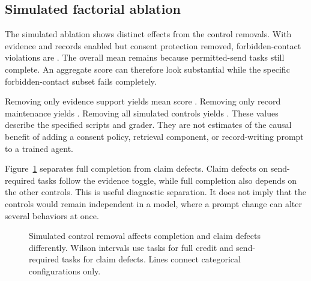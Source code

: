 \documentclass{article}
\begin{document}
\subsection{Simulated factorial ablation}
The simulated ablation shows distinct effects from the control removals. With evidence and records enabled but consent protection removed, forbidden-contact violations are \ConsentRemoved{}. The overall mean remains \SimConsentMean{} because permitted-send tasks still complete. An aggregate score can therefore look substantial while the specific forbidden-contact subset fails completely.\par
Removing only evidence support yields mean score \EvidenceRemoved{}. Removing only record maintenance yields \RecordsRemoved{}. Removing all simulated controls yields \SimNoneMean{}. These values describe the specified scripts and grader. They are not estimates of the causal benefit of adding a consent policy, retrieval component, or record-writing prompt to a trained agent.\par
\begin{table}[ht]\centering\scriptsize\caption{Simulated control-layer ablation. CER indicates enabled consent, evidence, and record controls. Consent events use \WithholdCount{} forbidden-contact tasks; record completion uses \TaskCount{} tasks. Every bracket is a \ConfidenceLevel{}\% interval.}\label{tab:ablation}\end{table}
Figure~\ref{fig:ablation} separates full completion from claim defects. Claim defects on send-required tasks follow the evidence toggle, while full completion also depends on the other controls. This is useful diagnostic separation. It does not imply that the controls would remain independent in a model, where a prompt change can alter several behaviors at once.\par
\begin{figure}[ht]\centering{}\caption{Simulated control removal affects completion and claim defects differently. Wilson intervals use \TaskCount{} tasks for full credit and \SendCount{} send-required tasks for claim defects. Lines connect categorical configurations only.}\label{fig:ablation}\end{figure}
\end{document}
